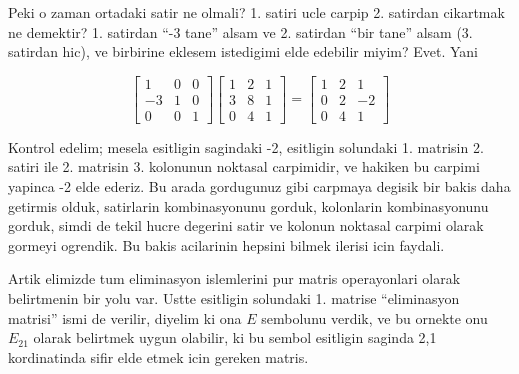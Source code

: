 \documentclass[12pt,fleqn]{article}\usepackage{../common}
\begin{document}
Peki o zaman ortadaki satir ne olmali? 1. satiri ucle carpip 2. satirdan
cikartmak ne demektir? 1. satirdan ``-3 tane'' alsam ve 2. satirdan ``bir
tane'' alsam (3. satirdan hic), ve birbirine eklesem istedigimi elde
edebilir miyim? Evet. Yani 

$$ 
\left[\begin{array}{rrr}
1 & 0 & 0 \\
-3 & 1 & 0 \\
0 & 0 & 1
\end{array}\right]
\left[\begin{array}{rrr}
1 & 2 & 1 \\
3 & 8 & 1 \\
0 & 4 & 1
\end{array}\right] =
\left[\begin{array}{rrr}
    1 & 2 & 1 \\
    0 & 2 & -2 \\
    0 & 4 & 1
  \end{array}\right]
 $$

Kontrol edelim; mesela esitligin sagindaki -2, esitligin solundaki
1. matrisin 2. satiri ile 2. matrisin 3. kolonunun noktasal carpimidir, ve
hakiken bu carpimi yapinca -2 elde ederiz. Bu arada gordugunuz gibi
carpmaya degisik bir bakis daha getirmis olduk, satirlarin kombinasyonunu
gorduk, kolonlarin kombinasyonunu gorduk, simdi de tekil hucre degerini 
satir ve kolonun noktasal carpimi olarak gormeyi ogrendik. Bu bakis
acilarinin hepsini bilmek ilerisi icin faydali.

Artik elimizde tum eliminasyon islemlerini pur matris operayonlari olarak
belirtmenin bir yolu var. Ustte esitligin solundaki 1. matrise
``eliminasyon matrisi'' ismi de verilir, diyelim ki ona $E$ sembolunu
verdik, ve bu ornekte onu $E_{21}$ olarak belirtmek uygun olabilir, ki bu
sembol esitligin saginda 2,1 kordinatinda sifir elde etmek icin gereken
matris. 
\end{document}

